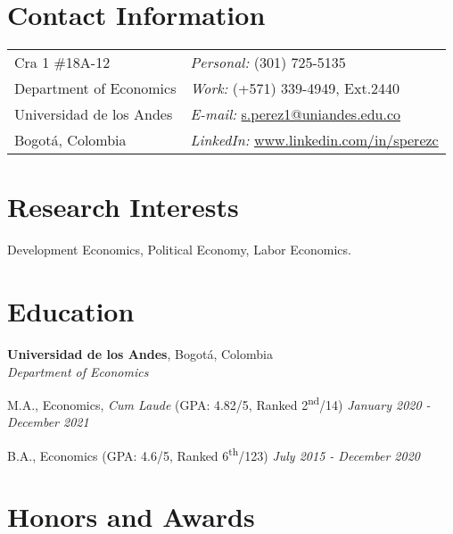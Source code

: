 \documentclass[margin,line]{res}
\newenvironment{list1}{
  \begin{list}{\ding{113}}{%
      \setlength{\itemsep}{0in}
      \setlength{\parsep}{0in} \setlength{\parskip}{0in}
      \setlength{\topsep}{0in} \setlength{\partopsep}{0in} 
      \setlength{\leftmargin}{0.17in}}}{\end{list}}
\begin{document}

\begin{resume}
\section{\sc Contact Information}
\vspace{.05in}
\begin{tabular}{@{}p{3in}p{3in}}
Cra 1 \#18A-12             & {\it Personal:}  (301) 725-5135 \\            
Department of Economics   & {\it Work:}    (+571) 339-4949, Ext.2440  \\         
Universidad de los Andes & {\it E-mail:}  \href{mailto:s.perez1@uniandes.edu.co}{s.perez1@uniandes.edu.co}\\       
Bogotá, Colombia  & {\it LinkedIn:} \href{https://www.linkedin.com/in/sperezc/}{www.linkedin.com/in/sperezc}  \\   
\end{tabular}


\section{\sc Research Interests}
Development Economics, Political Economy, Labor Economics.

\section{\sc Education}

{\bf Universidad de los Andes}, Bogotá, Colombia\\
{\em Department of Economics} \\
\begin{list1}

\item[]M.A., Economics, \textit{Cum Laude} (GPA: 4.82/5, Ranked 2\textsuperscript{nd}/14) \hfill  {\it January 2020 - December 2021}
\item[] B.A., Economics (GPA: 4.6/5, Ranked 6\textsuperscript{th}/123) \hfill {\it July 2015 - December 2020}

\end{list1}

\vspace{.1cm}

\section{\sc Honors and Awards} 


\end{resume}
\end{document}
